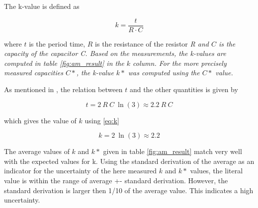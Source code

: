 \documentclass[journal]{IEEEtran}
\begin{document}
The k-value is defined as

\begin{equation}
	k = \frac{t}{R \cdot C}
	\label{eq:k}
\end{equation}

where $t$ is the period time, $R$ is the resistance of the resistor
\em{R} and $C$ is the capacity of the capacitor \em{C}. Based on the
measurements, the k-values are computed in table \ref{fig:am_result} in the $k$
column. For the more precisely measured capacities $C*$, the k-value $k*$ was
computed using the $C*$ value.

As mentioned in \cite{book_dg}, the relation between $t$ and the other
quantities is given by

\begin{equation}
	t = 2~R~C~\ln(3) \approx 2.2~R~C
\end{equation}

which gives the value of $k$ using \ref{eq:k}

\begin{equation}
	k = 2~\ln(3) \approx 2.2
	\label{eq:k_lit}
\end{equation}

The average values of $k$ and $k*$ given in table \ref{fig:am_result} match very
well with the expected values for k. Using the standard derivation of the average as
an indicator for the uncertainty of the here measured $k$ and $k*$ values, the
literal value is within the range of average +- standard derivation. However,
the standard derivation is larger then 1/10 of the average value. This indicates
a high uncertainty.
\end{document}

